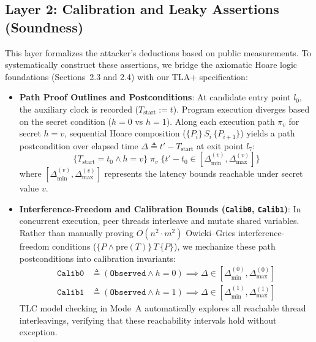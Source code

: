 \documentclass[a4paper,12pt]{report}
\begin{document}
\subsection{Layer 2: Calibration and Leaky Assertions (Soundness)}
This layer formalizes the attacker's deductions based on public measurements. To systematically construct these assertions, we bridge the axiomatic Hoare logic foundations (Sections~2.3 and 2.4) with our TLA+ specification:
\begin{itemize}[itemsep=0.2em, topsep=0.15em]
    \item \textbf{Path Proof Outlines and Postconditions}: At candidate entry point $l_0$, the auxiliary clock is recorded ($T_{\text{start}} := t$). Program execution diverges based on the secret condition ($h = 0$ vs $h = 1$). Along each execution path $\pi_v$ for secret $h = v$, sequential Hoare composition ($\{P_i\}\, S_i \,\{P_{i+1}\}$) yields a path postcondition over elapsed time $\Delta \triangleq t' - T_{\text{start}}$ at exit point $l_7$:
    \begin{equation}
        \{T_{\text{start}} = t_0 \land h = v\} \; \pi_v \; \{t' - t_0 \in [\Delta_{\min}^{(v)}, \Delta_{\max}^{(v)}]\}
    \end{equation}
    where $[\Delta_{\min}^{(v)}, \Delta_{\max}^{(v)}]$ represents the latency bounds reachable under secret value $v$.
    
    \item \textbf{Interference-Freedom and Calibration Bounds (\texttt{Calib0}, \texttt{Calib1})}: In concurrent execution, peer threads interleave and mutate shared variables. Rather than manually proving $O(n^2 \cdot m^2)$ Owicki--Gries interference-freedom conditions ($\{P \land \mathrm{pre}(T)\}\, T \,\{P\}$), we mechanize these path postconditions into calibration invariants:
    \begin{align*}
        \texttt{Calib0} &\triangleq (\texttt{Observed} \land h = 0) \implies \Delta \in [\Delta_{\min}^{(0)}, \Delta_{\max}^{(0)}] \\
        \texttt{Calib1} &\triangleq (\texttt{Observed} \land h = 1) \implies \Delta \in [\Delta_{\min}^{(1)}, \Delta_{\max}^{(1)}]
    \end{align*}
    TLC model checking in Mode~A automatically explores all reachable thread interleavings, verifying that these reachability intervals hold without exception.


\end{itemize}
\end{document}
